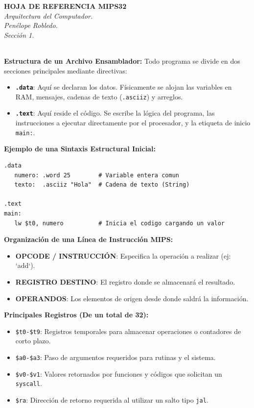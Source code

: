 \documentclass[12pt,a4paper]{article}
\begin{document}
\begin{center}
    \vspace*{0.5cm}
    {\Huge \textbf{\textcolor{colorAritmetica}{HOJA DE REFERENCIA MIPS32}}}\\[0.3cm]
    {\Large \textit{Arquitectura del Computador.\\ Penélope Robledo.\\ Sección 1.\\}}\\[0.8cm]
\end{center}

\begin{tcolorbox}[colback=gray!10, colframe=black, title=CONCEPTOS GENERALES, fonttitle=\bfseries\Large]

\textbf{Estructura de un Archivo Ensamblador:}
Todo programa se divide en dos secciones principales mediante directivas:
\begin{itemize}
    \item \textbf{\texttt{.data}}: Aquí se declaran los datos. Físicamente se alojan las variables en RAM, mensajes, cadenas de texto (\texttt{.asciiz}) y arreglos.
    \item \textbf{\texttt{.text}}: Aquí reside el código. Se escribe la lógica del programa, las instrucciones a ejecutar directamente por el procesador, y la etiqueta de inicio \texttt{main:}.
\end{itemize}

\textbf{Ejemplo de una Sintaxis Estructural Inicial:}
\begin{lstlisting}[numbers=none]
.data
   numero: .word 25        # Variable entera comun
   texto:  .asciiz "Hola"  # Cadena de texto (String)

.text
main:
   lw $t0, numero          # Inicia el codigo cargando un valor
\end{lstlisting}

\textbf{Organización de una Línea de Instrucción MIPS:}
\begin{itemize}
    \item \textbf{OPCODE / INSTRUCCIÓN}: Especifica la operación a realizar (ej: `add`).
    \item \textbf{REGISTRO DESTINO}: El registro donde se almacenará el resultado.
    \item \textbf{OPERANDOS}: Los elementos de origen desde donde saldrá la información.
\end{itemize}

\textbf{Principales Registros (De un total de 32):}
\begin{itemize}
    \item \texttt{\$t0-\$t9}: Registros temporales para almacenar operaciones o contadores de corto plazo.
    \item \texttt{\$a0-\$a3}: Paso de argumentos requeridos para rutinas y el sistema.
    \item \texttt{\$v0-\$v1}: Valores retornados por funciones y códigos que solicitan un \texttt{syscall}.
    \item \texttt{\$ra}: Dirección de retorno requerida al utilizar un salto tipo \texttt{jal}.
\end{itemize}
\end{tcolorbox}
\end{document}
